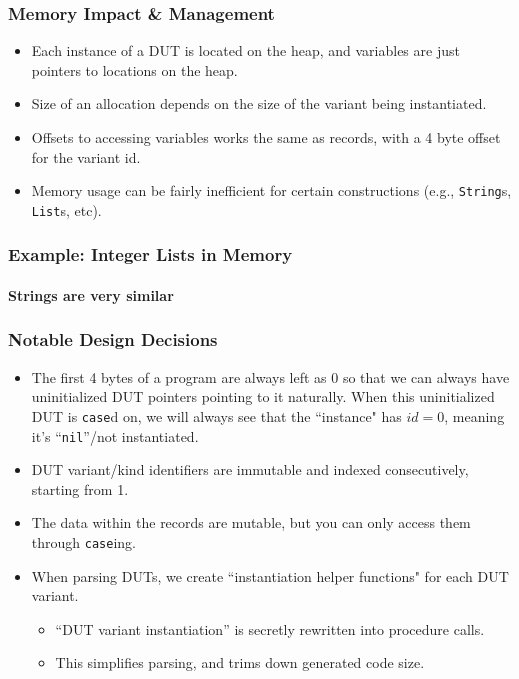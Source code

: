 \documentclass{beamer}
\begin{document}
\begin{frame}
\frametitle{Memory Impact \& Management}
\begin{itemize}
 \item<1-> Each instance of a DUT is located on the heap, and variables are just pointers to locations on the heap.
 \item<2-> Size of an allocation depends on the size of the variant being instantiated.
 \item<3-> Offsets to accessing variables works the same as records, with a 4 byte offset for the variant id.
 \item<4-> Memory usage can be fairly inefficient for certain constructions (e.g., \texttt{String}s, \texttt{List}s, etc).
\end{itemize}

\begin{figure}
  
\end{figure}
\end{frame}

\begin{frame}
\frametitle{Example: Integer Lists in Memory}
\framesubtitle{Strings are very similar}
\begin{figure}
  
\end{figure}
\end{frame}


\begin{frame}
\frametitle{Notable Design Decisions}

\begin{itemize}
 \item<1-> The first 4 bytes of a program are always left as 0 so that we can always have uninitialized DUT pointers pointing to it naturally. When this uninitialized DUT is \texttt{case}d on, we will always see that the ``instance" has $id = 0$, meaning it's ``\texttt{nil}''/not instantiated.
 \item<2-> DUT variant/kind identifiers are immutable and indexed consecutively, starting from 1.
 \item<3-> The data within the records are mutable, but you can only access them through \texttt{case}ing.
 \item<4-> When parsing DUTs, we create ``instantiation helper functions" for each DUT variant. 
 \begin{itemize}
  \item<5-> ``DUT variant instantiation'' is secretly rewritten into procedure calls.
  \item<6-> This simplifies parsing, and trims down generated code size.
 \end{itemize}
\end{itemize}
\end{frame}
\end{document}
